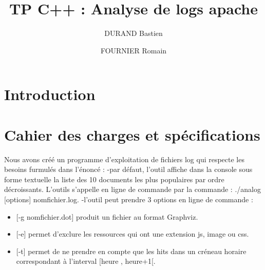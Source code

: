 \documentclass[a4paper]{article}
\title{TP C++ \no 4 : 
\bigbreak
Analyse de logs apache
}
\author{DURAND Bastien \and FOURNIER Romain}
\begin{document}
\maketitle
\thispagestyle{fancy}

\tableofcontents
\listoffigures
\smallbreak

\section*{Introduction}\noindent
\newpage

\section{Cahier des charges et spécifications}\noindent
	
	Nous avons créé un programme d'exploitation de fichiers log qui respecte les besoins furmulés dans l'énoncé :
	-par défaut, l'outil affiche dans la console sous forme textuelle la liste des 10 documents les plus populaires par ordre décroissants. L'outils s'appelle en ligne de commande par la commande : ./analog [options] nomfichier.log.
	-l'outil peut prendre 3 options en ligne de commande :
	\begin{itemize}
		\item{} [-g nomfichier.dot] produit un fichier au format Graphviz.
		\item{} [-e] permet d'exclure les ressources qui ont une extension js, image ou css.
		\item{} [-t] permet de ne prendre en compte que les hits dans un créneau horaire correspondant à l'interval [heure , heure+1[.
	\end{itemize}
	
\end{document}
